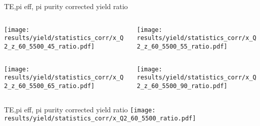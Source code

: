 \begin{frame}{TE,pi eff, pi purity corrected yield ratio}
\begin{columns}
\begin{column}[T]{0.5\textwidth}
\texttt{[image: results/yield/statistics\_corr/x\_Q2\_z\_60\_5500\_45\_ratio.pdf]}
\end{column}
\begin{column}[T]{0.5\textwidth}
\texttt{[image: results/yield/statistics\_corr/x\_Q2\_z\_60\_5500\_55\_ratio.pdf]}
\end{column}
\end{columns}
\begin{columns}
\begin{column}[T]{0.5\textwidth}
\texttt{[image: results/yield/statistics\_corr/x\_Q2\_z\_60\_5500\_65\_ratio.pdf]}
\end{column}
\begin{column}[T]{0.5\textwidth}
\texttt{[image: results/yield/statistics\_corr/x\_Q2\_z\_60\_5500\_90\_ratio.pdf]}
\end{column}
\end{columns}
\end{frame}
\begin{frame}{TE,pi eff, pi purity corrected yield ratio}
\texttt{[image: results/yield/statistics\_corr/x\_Q2\_60\_5500\_ratio.pdf]}
\end{frame}
